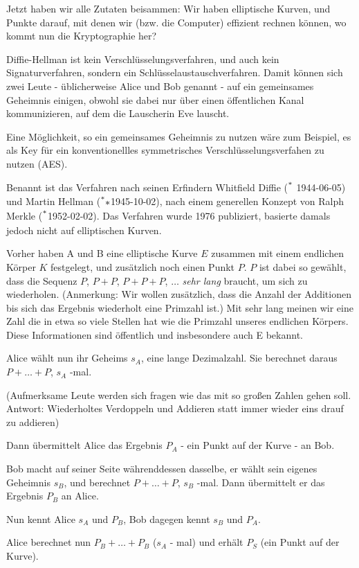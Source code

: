 \documentclass{article}
\begin{document}
Jetzt haben wir alle Zutaten beisammen: Wir haben elliptische Kurven, und
Punkte darauf, mit denen wir (bzw. die Computer) effizient rechnen können, wo
kommt nun die Kryptographie her?

Diffie-Hellman ist kein Verschlüsselungsverfahren, und auch kein
Signaturverfahren, sondern ein Schlüsselaustauschverfahren.  Damit können sich
zwei Leute - üblicherweise Alice und Bob genannt - auf ein gemeinsames
Geheimnis einigen, obwohl sie dabei nur über einen öffentlichen Kanal kommunizieren,
auf dem die Lauscherin Eve lauscht.

Eine Möglichkeit, so ein gemeinsames Geheimnis zu nutzen wäre zum
Beispiel, es als Key für ein konventionellles symmetrisches
Verschlüsselungsverfahen zu nutzen (AES).

Benannt ist das Verfahren nach seinen Erfindern Whitfield Diffie
($\strut^*$ 1944-06-05) und Martin
Hellman ($\strut^**$1945-10-02), nach einem generellen Konzept von Ralph
Merkle ($\strut^*$1952-02-02). Das Verfahren wurde 1976 publiziert, basierte
damals jedoch nicht auf elliptischen Kurven.

Vorher haben A und B eine elliptische Kurve $E$ zusammen mit einem
endlichen Körper $K$ festgelegt, und zusätzlich noch einen Punkt $P$. $P$
ist dabei so gewählt, dass die Sequenz $P$, $P+P$, $P+P+P$, $\ldots$
\emph{sehr lang}
braucht, um sich zu wiederholen. (Anmerkung: Wir wollen zusätzlich, dass die
Anzahl der Additionen bis sich das Ergebnis wiederholt eine Primzahl ist.) Mit
sehr lang meinen wir eine Zahl die in etwa so viele Stellen hat wie die Primzahl
unseres endlichen Körpers. Diese Informationen sind öffentlich
und insbesondere auch E bekannt.

Alice wählt nun ihr Geheims $s_A$, eine lange Dezimalzahl. Sie berechnet
daraus $P + \ldots + P$, $s_A$ -mal.

(Aufmerksame Leute werden sich fragen wie das mit so großen Zahlen
gehen soll. Antwort: Wiederholtes Verdoppeln und Addieren statt immer wieder
eins drauf zu addieren)

Dann übermittelt Alice das Ergebnis $P_A$ - ein Punkt auf der Kurve - an
Bob.

Bob macht auf seiner Seite währenddessen dasselbe, er wählt sein
eigenes Geheimnis $s_B$, und berechnet $P + \ldots + P$, $s_B$ -mal. Dann
übermittelt er das Ergebnis $P_B$ an Alice.

Nun kennt Alice $s_A$ und $P_B$, Bob dagegen kennt $s_B$ und $P_A$.

Alice berechnet nun $P_B + \ldots + P_B$ ($s_A$ - mal) und erhält $P_S$ (ein
Punkt auf der Kurve).
\end{document}
